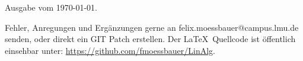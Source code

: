 Ausgabe vom \today.

Fehler, Anregungen und Ergänzungen gerne an felix.moessbauer@campus.lmu.de senden, oder direkt ein GIT Patch erstellen. Der \LaTeX ~Quellcode ist öffentlich einsehbar unter: \url{https://github.com/fmoessbauer/LinAlg}.
